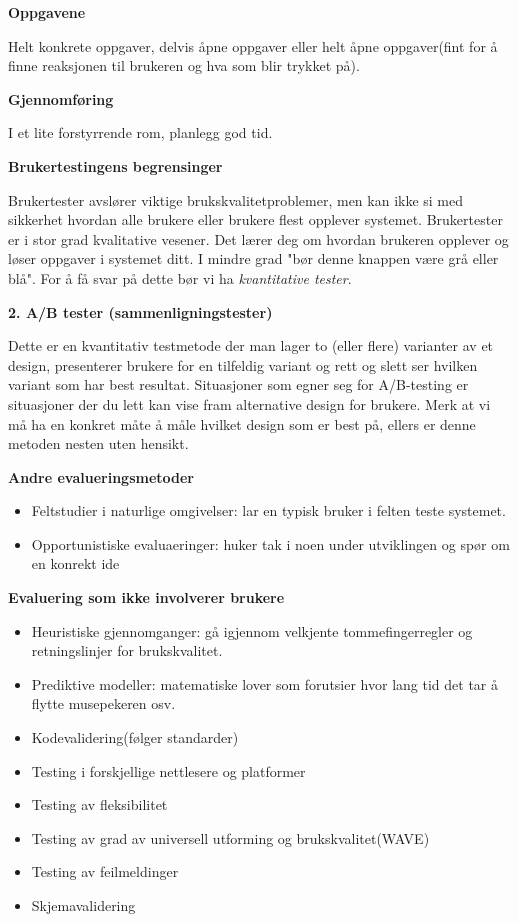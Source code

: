 \documentclass{article}
\begin{document}
\begin{flushleft}
\textbf{Oppgavene}\par 
Helt konkrete oppgaver, delvis åpne oppgaver eller helt åpne oppgaver(fint for å finne reaksjonen til brukeren og hva som blir trykket på).
\bigskip

\textbf{Gjennomføring}\par
I et lite forstyrrende rom, planlegg god tid. 

\textbf{Brukertestingens begrensinger}\par
Brukertester avslører viktige brukskvalitetproblemer, men kan ikke si med sikkerhet hvordan alle brukere eller brukere flest opplever systemet.
Brukertester er i stor grad kvalitative vesener. Det lærer deg om hvordan brukeren opplever og løser oppgaver i systemet ditt.
I mindre grad "bør denne knappen være grå eller blå". For å få svar på dette bør vi ha \emph{kvantitative tester}.

\bigskip

\textbf{2. A/B tester (sammenligningstester)}\par
Dette er en kvantitativ testmetode der man lager to (eller flere) varianter av et design, presenterer
brukere for en tilfeldig variant og rett og slett ser hvilken variant som har best resultat.
Situasjoner som egner seg for A/B-testing er situasjoner der du lett kan vise fram alternative
design for brukere. Merk at vi må ha en konkret måte å måle hvilket design som er best på, ellers er denne metoden
nesten uten hensikt.
\bigskip

\textbf{Andre evalueringsmetoder}\par
\begin{itemize}
    \item Feltstudier i naturlige omgivelser: lar en typisk bruker i felten teste systemet. 
    \item Opportunistiske evaluaeringer: huker tak i noen under utviklingen og spør om en konrekt ide
\end{itemize}
\bigskip
\textbf{\large Evaluering som ikke involverer brukere}\par
\bigskip
\begin{itemize}
    \item Heuristiske gjennomganger: gå igjennom velkjente tommefingerregler og retningslinjer for brukskvalitet.
    \item Prediktive modeller: matematiske lover som forutsier hvor lang tid det tar å flytte musepekeren osv. 
    \item Kodevalidering(følger standarder)
    \item Testing i forskjellige nettlesere og platformer
    \item Testing av fleksibilitet
    \item Testing av grad av universell utforming og brukskvalitet(WAVE)
    \item Testing av feilmeldinger
    \item Skjemavalidering


\end{itemize}
\end{flushleft}
\end{document}
